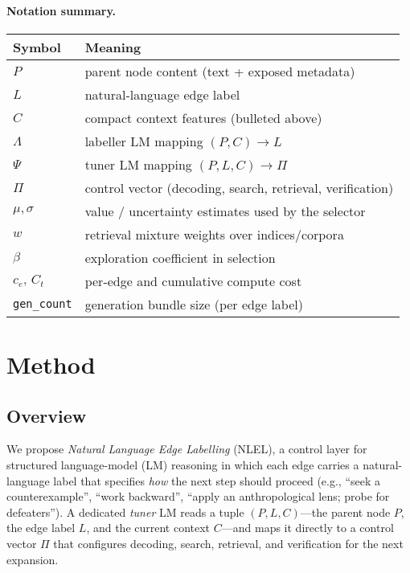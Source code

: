 \documentclass{article}
\theoremstyle{plain}
\theoremstyle{definition}
\theoremstyle{remark}
\begin{document}
\paragraph{Notation summary.}
\begin{center}
\begin{tabular}{@{}ll@{}}
\toprule
Symbol & Meaning \\\midrule
$P$ & parent node content (text + exposed metadata) \\
$L$ & natural-language edge label \\
$C$ & compact context features (bulleted above) \\
$\Lambda$ & labeller LM mapping $(P,C)\!\to\!L$ \\
$\Psi$ & tuner LM mapping $(P,L,C)\!\to\!\Pi$ \\
$\Pi$ & control vector (decoding, search, retrieval, verification) \\
$\mu,\sigma$ & value / uncertainty estimates used by the selector \\
$w$ & retrieval mixture weights over indices/corpora \\
$\beta$ & exploration coefficient in selection \\
$c_e,\,C_t$ & per-edge and cumulative compute cost \\
\texttt{gen\_count} & generation bundle size (per edge label) \\
\bottomrule
\end{tabular}
\end{center}

\section{Method}
\label{sec:method}

\subsection{Overview}
We propose \emph{Natural Language Edge Labelling} (NLEL), a control layer for structured language-model (LM) reasoning in which each edge carries a natural-language label that specifies \emph{how} the next step should proceed (e.g., ``seek a counterexample'', ``work backward'', ``apply an anthropological lens; probe for defeaters''). A dedicated \emph{tuner} LM reads a tuple $(P,L,C)$---the parent node $P$, the edge label $L$, and the current context $C$---and maps it directly to a control vector $\Pi$ that configures decoding, search, retrieval, and verification for the next expansion.
\end{document}
